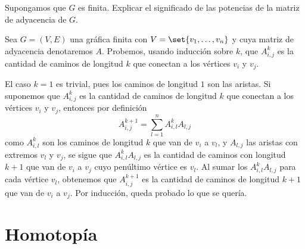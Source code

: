 \begin{ejer}
Supongamos que $G$ es finita. Explicar el significado de las potencias de la matriz de adyacencia de $G$.
\end{ejer}
\begin{sol}
Sea $G = (V,E)$ una gráfica finita con $V=\set{v_1,\dots,v_n}$ y cuya matriz de adyacencia denotaremos $A$. Probemos, usando inducción sobre $k$, que $A^k_{i,j}$ es la cantidad de caminos de longitud $k$ que conectan a los vértices $v_i$ y $v_j$.\par
El caso $k = 1$ es trivial, pues los caminos de longitud $1$ son las aristas. Si suponemos que $A^k_{i,j}$ es la cantidad de caminos de longitud $k$ que conectan a los vértices $v_i$ y $v_j$, entonces por definición
\[
    A^{k+1}_{i,j} = \sum^n_{l=1} A^k_{i,l}A_{l,j}
\]
como $A^k_{i,l}$ son los caminos de longitud $k$ que van de $v_i$ a $v_l$, y $A_{l,j}$ las aristas con extremos $v_l$ y $v_j$, se sigue que $A^k_{i,l}A_{l,j}$ es la cantidad de caminos con longitud $k+1$ que van de $v_i$ a $v_j$ cuyo penúltimo vértice es $v_l$. Al sumar los $A^k_{i,l}A_{l,j}$ para cada vértice $v_l$, obtenemos que $A^{k+1}_{i,j}$ es la cantidad de caminos de longitud $k+1$ que van de $v_i$ a $v_j$. Por inducción, queda probado lo que se quería.
\end{sol}\clearpage


\section{Homotopía}

